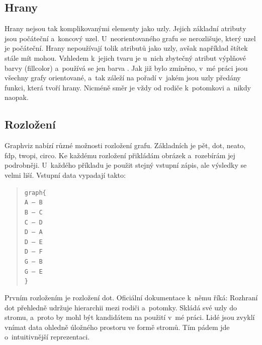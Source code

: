 \documentclass[printed,color,table,oneside,nolot,nolof]{fithesis}
\begin{document}
\subsection{Hrany}
	Hrany nejsou tak komplikovanými elementy jako uzly. Jejich základní atributy jsou počáteční a~koncový uzel. U~neorientovaného grafu se nerozlišuje, který uzel je počáteční. Hrany 
	nepoužívají tolik atributů jako uzly, avšak například štítek stále mít mohou. Vzhledem k~jejich tvaru je u~nich zbytečný atribut výplňové barvy (fillcolor) a~používá se jen barva 
	.
	Jak již bylo zmíněno, v~mé práci jsou všechny grafy orientované, a~tak záleží na pořadí v~jakém jsou uzly předány funkci, která tvoří hrany. Nicméně směr je vždy od rodiče k~potomkovi
	a~nikdy naopak.
	
\subsection{Rozložení}
	Graphviz nabízí různé možnosti rozložení grafu. Základních je pět, dot, neato, fdp, twopi, circo. Ke každému rozložení přikládám obrázek a~rozebírám jej 
	podrobněji. U~každého příkladu je použit stejný vstupní zápis, ale výsledky se velmi liší. Vstupní data vypadají takto:
	\pagebreak[4]
	\begin{quotation}
		\texttt{graph\{\\
		A~-- B\\
		B -- C\\
		C -- D\\
		D -- A\\
		D -- E\\
		D -- F\\
		G -- B\\
		G -- E\\
	\}}
	\end{quotation}

	Prvním rozložením je rozložení dot. Oficiální dokumentace k~němu říká:
	\cite{graphviz_layout} 
	Rozhraní dot přehledně udržuje hierarchii mezi rodiči a~potomky. Skládá
	své uzly do stromu, a~proto by mohl být kandidátem na použití v~mé práci. Lidé jsou zvyklí vnímat data ohledně úložného prostoru ve formě stromů. Tím pádem jde o~intuitivnější
	reprezentaci.
\end{document}
